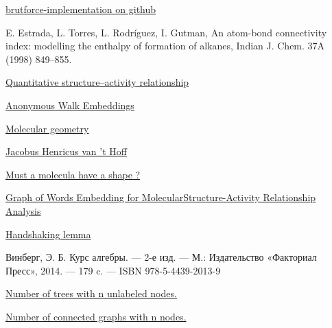 \documentclass{article}
\begin{document}
\begin{thebibliography}{3}

\hypertarget{first_bibitem}{}
\href{https://github.com/dertuner-flex/abc_index/}{ brutforce-implementation on github }

\hypertarget{fisrt_mention}{}
E. Estrada, L. Torres, L. Rodríguez, I. Gutman, An atom-bond connectivity index: modelling the enthalpy of formation of alkanes, Indian J. Chem. 37A
(1998) 849–855.

\hypertarget{qsar_link}{}
\href{https://en.wikipedia.org/wiki/Quantitative_structure%E2%80%93activity_relationship}{ Quantitative structure–activity relationship }


\hypertarget{random_walk}{}
\href{https://arxiv.org/pdf/1805.11921.pdf}{ Anonymous Walk Embeddings }

\hypertarget{molecular_geometry}{}
\href{ https://en.wikipedia.org/wiki/Molecular_geometry }{ Molecular geometry }


\hypertarget{first_people_stereochemistry}{}
\href{ https://en.wikipedia.org/wiki/Jacobus_Henricus_van_%27t_Hoff }{ Jacobus Henricus van 't Hoff }


\hypertarget{must_molecula_have_shape}{}
\href{https://pubs.acs.org/doi/pdf/10.1021/ja00472a009} {Must a molecula have a shape ? }


\hypertarget{molecular_embedding}{}
\href{https://pubs.acs.org/doi/pdf/10.1021/ja00472a009} {Graph of Words Embedding for MolecularStructure-Activity Relationship Analysis }

\hypertarget{handshaking_lemma}{}
\href{https://pubs.acs.org/doi/pdf/10.1021/ja00472a009} {Handshaking lemma}

\hypertarget{orbit_theorem}{}
Винберг, Э. Б. Курс алгебры. — 2-е изд. — М.: Издательство «Факториал Пресс», 2014. — 179 c. — ISBN 978-5-4439-2013-9 

\hypertarget{count_tree}{}
\href{http://oeis.org/A000055} {Number of trees with n unlabeled nodes.} 

\hypertarget{count_graphs}{}
\href{http://oeis.org/A001349} {Number of connected graphs with n nodes.} 



\end{thebibliography}
\end{document}
